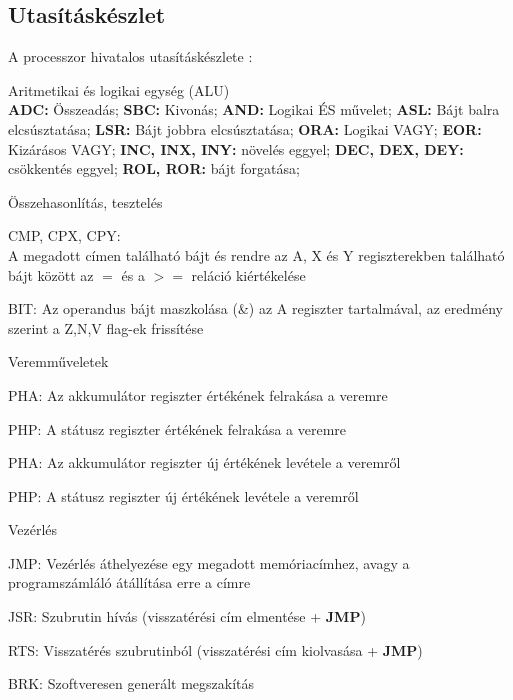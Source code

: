 \subsection{Utasításkészlet}
\label{instructionset}
A processzor hivatalos utasításkészlete \cite{6502desc, 6502opc, 6502instr}:
\begin{compactdesc}
	\item Aritmetikai és logikai egység (ALU) \hfill \\
	\textbf{ADC:} Összeadás;
	\textbf{SBC:} Kivonás;
	\textbf{AND:} Logikai ÉS művelet;
	\textbf{ASL:} Bájt balra elcsúsztatása;
	\textbf{LSR:} Bájt jobbra elcsúsztatása;
	\textbf{ORA:} Logikai VAGY;
	\textbf{EOR:} Kizárásos VAGY;
	\textbf{INC, INX, INY:} növelés eggyel;
	\textbf{DEC, DEX, DEY:} csökkentés eggyel;
	\textbf{ROL, ROR:} bájt forgatása;
	\item 
	Összehasonlítás, tesztelés
	\begin{compactdesc}
		\item[CMP, CPX, CPY:]  \hfill \\ A megadott címen található bájt és rendre az A, X és Y regiszterekben található bájt között az $=$ és a $>=$ reláció kiértékelése
		\item[BIT:] Az operandus bájt maszkolása (\&) az A regiszter tartalmával, az eredmény szerint a Z,N,V flag-ek frissítése 
	\end{compactdesc}
	\item Veremműveletek
	\begin{compactdesc}
		\item[PHA:] Az akkumulátor regiszter értékének felrakása a veremre 
		\item[PHP:] A státusz regiszter értékének felrakása a veremre
		\item[PHA:] Az akkumulátor regiszter új értékének levétele a veremről
		\item[PHP:] A státusz regiszter új értékének levétele a veremről
	\end{compactdesc}
	\item Vezérlés
	\begin{compactdesc}
		\item[JMP:] Vezérlés áthelyezése egy megadott memóriacímhez, avagy a programszámláló átállítása erre a címre
		\item[JSR:] Szubrutin hívás (visszatérési cím elmentése + \textbf{JMP})
		\item[RTS:] Visszatérés szubrutinból (visszatérési cím kiolvasása + \textbf{JMP})
		\item[BRK:] Szoftveresen generált megszakítás

\end{compactdesc}
\end{compactdesc}

